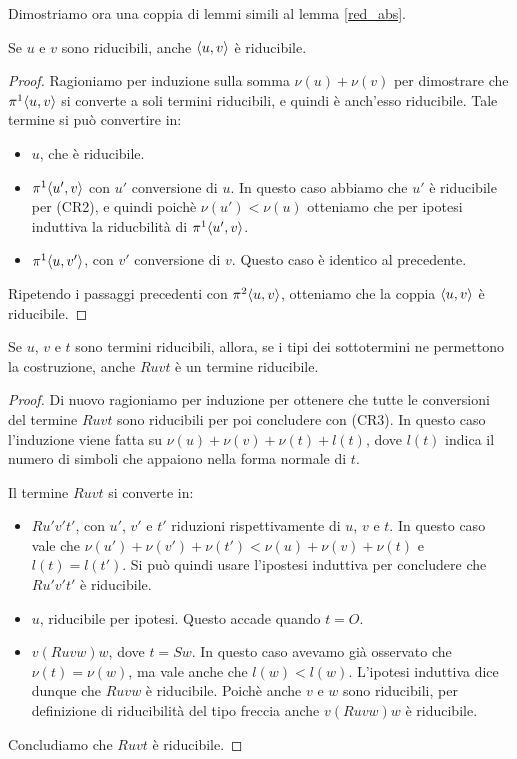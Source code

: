 \documentclass[]{marticle}
\begin{document}
Dimostriamo ora una coppia di lemmi simili al lemma \ref{red_abs}.

\begin{block}[Lemma]
    \label{red_cpl}
    Se $u$ e $v$ sono riducibili, anche $\langle u,v \rangle$ \`e riducibile.
\end{block}
\begin{proof}
    Ragioniamo per induzione sulla somma $\nu(u)+\nu(v)$ per dimostrare che
    $\pi^1\langle u,v \rangle$ si converte a soli termini riducibili, e quindi \`e
    anch'esso riducibile. Tale termine si pu\`o convertire in:
    \begin{itemize}
        \item $u$, che \`e riducibile.
        \item $\pi^1\langle u',v \rangle$ con $u'$ conversione di $u$. In questo caso
            abbiamo che $u'$ \`e riducibile per (CR2), e quindi poich\`e
            $\nu(u')<\nu(u)$ otteniamo che per ipotesi induttiva la
            riducbilit\`a di $\pi^1\langle u',v \rangle$.
        \item $\pi^1\langle u,v' \rangle$, con $v'$ conversione di $v$. Questo caso \`e
            identico al precedente.
    \end{itemize}

    Ripetendo i passaggi precedenti con $\pi^2\langle u,v \rangle$, otteniamo che la
    coppia $\langle u,v \rangle$ \`e riducibile.
\end{proof}

\begin{block}[Lemma]
    \label{red_rec}
    Se $u$, $v$ e $t$ sono termini riducibili, allora, se i tipi dei
    sottotermini ne permettono la costruzione, anche $Ruvt$ \`e un termine
    riducibile.
\end{block}
\begin{proof}
    Di nuovo ragioniamo per induzione per ottenere che tutte le conversioni del
    termine $Ruvt$ sono riducibili per poi concludere con (CR3). In questo caso
    l'induzione viene fatta su $\nu(u) + \nu(v) + \nu(t) + l(t)$, dove $l(t)$
    indica il numero di simboli che appaiono nella forma normale di $t$.

    Il termine $Ruvt$ si converte in:
    \begin{itemize}
        \item $Ru'v't'$, con $u'$, $v'$ e $t'$ riduzioni rispettivamente di $u$,
            $v$ e $t$. In questo caso vale che $\nu(u') + \nu(v') + \nu(t')
            < \nu(u) + \nu(v) + \nu(t)$ e $l(t)=l(t')$. Si pu\`o quindi usare
            l'ipostesi induttiva per concludere che $R u'v't'$ \`e riducibile.
        \item $u$, riducibile per ipotesi. Questo accade quando $t=O$. 
        \item $v(Ruvw)w$, dove $t=Sw$. In questo caso avevamo gi\`a osservato
            che $\nu(t) = \nu(w)$, ma vale anche che $l(w) < l(w)$. L'ipotesi
            induttiva dice dunque che $Ruvw$ \`e riducibile. Poich\`e anche $v$
            e $w$ sono riducibili, per definizione di riducibilit\`a del tipo
            freccia anche $v(Ruvw)w$ \`e riducibile.
    \end{itemize}
    Concludiamo che $Ruvt$ \`e riducibile.
\end{proof}
\end{document}
